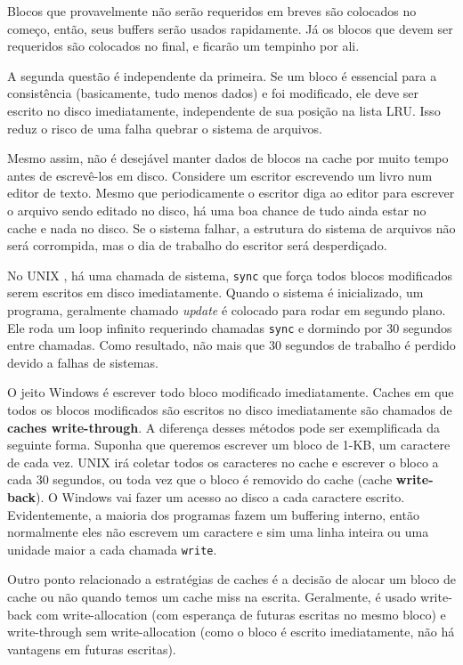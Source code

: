 \documentclass{article}
\newcommand\unix{{\color{red}UNIX} }
\begin{document}
Blocos que provavelmente não serão requeridos em breves são colocados no começo, então, seus buffers serão usados rapidamente. Já os blocos que devem ser requeridos são colocados no final, e ficarão um tempinho por ali.

A segunda questão é independente da primeira. Se um bloco é essencial para a consistência (basicamente, tudo menos dados) e foi modificado, ele deve ser escrito no disco imediatamente, independente de sua posição na lista LRU. Isso reduz o risco de uma falha quebrar o sistema de arquivos.

Mesmo assim, não é desejável manter dados de blocos na cache por muito tempo antes de escrevê-los em disco. Considere um escritor escrevendo um livro num editor de texto. Mesmo que periodicamente o escritor diga ao editor para escrever o arquivo sendo editado no disco, há uma boa chance de tudo ainda estar no cache e nada no disco. Se o sistema falhar, a estrutura do sistema de arquivos não será corrompida, mas o dia de trabalho do escritor será desperdiçado. 

No \unix, há uma chamada de sistema, \verb|sync| que força todos blocos modificados serem escritos em disco imediatamente. Quando o sistema é inicializado, um programa, geralmente chamado \textit{update} é colocado para rodar em segundo plano. Ele roda um loop infinito requerindo chamadas \verb|sync| e dormindo por 30 segundos entre chamadas. Como resultado, não mais que 30 segundos de trabalho é perdido devido a falhas de sistemas.

O jeito Windows é escrever todo bloco modificado imediatamente. Caches em que todos os blocos modificados são escritos no disco imediatamente são chamados de \textbf{caches write-through}. A diferença desses métodos pode ser exemplificada da seguinte forma. Suponha que queremos escrever um bloco de 1-KB, um caractere de cada vez. \unix irá coletar todos os caracteres no cache e escrever o bloco a cada 30 segundos, ou toda vez que o bloco é removido do cache (cache \textbf{write-back}). O Windows vai fazer um acesso ao disco a cada caractere escrito. Evidentemente, a maioria dos programas fazem um buffering interno, então normalmente eles não escrevem um caractere e sim uma linha inteira ou uma unidade maior a cada chamada \verb|write|.

Outro ponto relacionado a estratégias de caches é a decisão de alocar um bloco de cache ou não quando temos um cache miss na escrita. Geralmente, é usado write-back com write-allocation (com esperança de futuras escritas no mesmo bloco) e write-through sem write-allocation (como o bloco é escrito imediatamente, não há vantagens em futuras escritas). 
\end{document}

